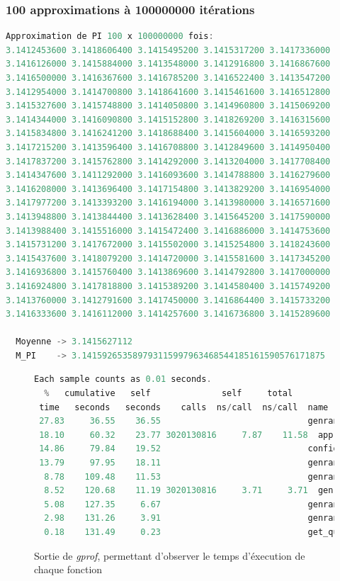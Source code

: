 \documentclass{article}
\begin{document}
\subsubsection{100 approximations à 100000000 itérations}
\begin{lstlisting}[language=c++]
  Approximation de PI 100 x 100000000 fois:
3.1412453600 3.1418606400 3.1415495200 3.1415317200 3.1417336000 
3.1416126000 3.1415884000 3.1413548000 3.1412916800 3.1416867600 
3.1416500000 3.1416367600 3.1416785200 3.1416522400 3.1413547200 
3.1412954000 3.1414700800 3.1418641600 3.1415461600 3.1416512800 
3.1415327600 3.1415748800 3.1414050800 3.1414960800 3.1415069200 
3.1414344000 3.1416090800 3.1415152800 3.1418269200 3.1416315600 
3.1415834800 3.1416241200 3.1418688400 3.1415604000 3.1416593200 
3.1417215200 3.1413596400 3.1416708800 3.1412849600 3.1414950400 
3.1417837200 3.1415762800 3.1414292000 3.1413204000 3.1417708400 
3.1414347600 3.1411292000 3.1416093600 3.1414788800 3.1416279600 
3.1416208000 3.1413696400 3.1417154800 3.1413829200 3.1416954000 
3.1417977200 3.1413393200 3.1416194000 3.1413980000 3.1416571600 
3.1413948800 3.1413844400 3.1413628400 3.1415645200 3.1417590000 
3.1413988400 3.1415516000 3.1415472400 3.1416886000 3.1414753600 
3.1415731200 3.1417672000 3.1415502000 3.1415254800 3.1418243600 
3.1415437600 3.1418079200 3.1414720000 3.1415581600 3.1417345200 
3.1416936800 3.1415760400 3.1413869600 3.1414792800 3.1417000000 
3.1416924800 3.1417818800 3.1415389200 3.1414580400 3.1415749200 
3.1413760000 3.1412791600 3.1417450000 3.1416864400 3.1415733200 
3.1416333600 3.1416112000 3.1414257600 3.1416736800 3.1415289600 

  Moyenne -> 3.1415627112
  M_PI    -> 3.141592653589793115997963468544185161590576171875
\end{lstlisting}

\begin{figure}[!ht]
\caption{Sortie de \emph{gprof}, permettant d'observer le temps d'éxecution de chaque fonction}
\begin{lstlisting}[language=c++]
  Each sample counts as 0.01 seconds.
  %   cumulative   self              self     total           
 time   seconds   seconds    calls  ns/call  ns/call  name    
 27.83     36.55    36.55                             genrand_res53
 18.10     60.32    23.77 3020130816     7.87    11.58  approx_pi
 14.86     79.84    19.52                             confidences_intervals_95
 13.79     97.95    18.11                             genrand_real2
  8.78    109.48    11.53                             genrand_real3
  8.52    120.68    11.19 3020130816     3.71     3.71  genrand_int31
  5.08    127.35     6.67                             genrand_real1
  2.98    131.26     3.91                             genrand_int32
  0.18    131.49     0.23                             get_quantil
\end{lstlisting}
\end{figure}
\end{document}
